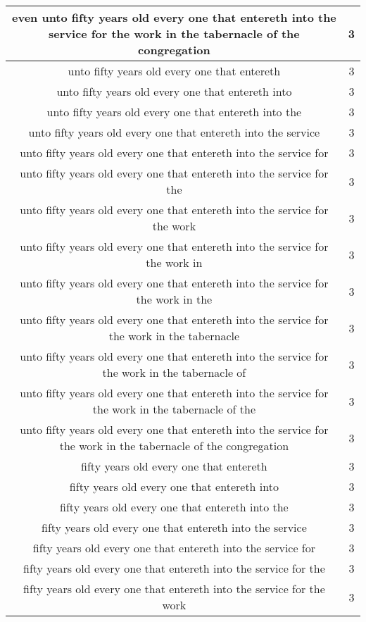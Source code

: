 \begin{center}
\begin{longtable}{|c|c|}
even unto fifty years old every one that entereth into the service for the work in the tabernacle of the congregation & 3\\ \hline 
unto fifty years old every one that entereth & 3\\ \hline 
unto fifty years old every one that entereth into & 3\\ \hline 
unto fifty years old every one that entereth into the & 3\\ \hline 
unto fifty years old every one that entereth into the service & 3\\ \hline 
unto fifty years old every one that entereth into the service for & 3\\ \hline 
unto fifty years old every one that entereth into the service for the & 3\\ \hline 
unto fifty years old every one that entereth into the service for the work & 3\\ \hline 
unto fifty years old every one that entereth into the service for the work in & 3\\ \hline 
unto fifty years old every one that entereth into the service for the work in the & 3\\ \hline 
unto fifty years old every one that entereth into the service for the work in the tabernacle & 3\\ \hline 
unto fifty years old every one that entereth into the service for the work in the tabernacle of & 3\\ \hline 
unto fifty years old every one that entereth into the service for the work in the tabernacle of the & 3\\ \hline 
unto fifty years old every one that entereth into the service for the work in the tabernacle of the congregation & 3\\ \hline 
fifty years old every one that entereth & 3\\ \hline 
fifty years old every one that entereth into & 3\\ \hline 
fifty years old every one that entereth into the & 3\\ \hline 
fifty years old every one that entereth into the service & 3\\ \hline 
fifty years old every one that entereth into the service for & 3\\ \hline 
fifty years old every one that entereth into the service for the & 3\\ \hline 
fifty years old every one that entereth into the service for the work & 3\\ \hline 

\end{longtable}
\end{center}
